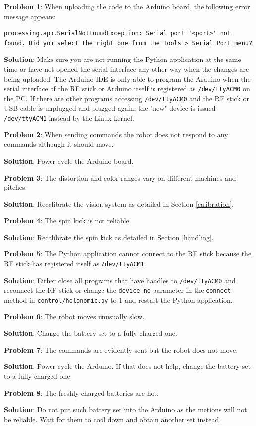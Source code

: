 \documentclass[a4paper,12pt]{article}
\begin{document}
\textbf{Problem 1}: When uploading the code to the Arduino board, the following error message appears:
\begin{lstlisting}
processing.app.SerialNotFoundException: Serial port '<port>' not found. Did you select the right one from the Tools > Serial Port menu?
\end{lstlisting}

\textbf{Solution}: Make sure you are not running the Python application at the same time or have not opened the serial interface any other way when the changes are being uploaded. The Arduino IDE is only able to program the Arduino when the serial interface of the RF stick or Arduino itself is registered as \texttt{/dev/ttyACM0} on the PC. If there are other programs accessing \texttt{/dev/ttyACM0} and the RF stick or USB cable is unplugged and plugged again, the "new" device is issued \texttt{/dev/ttyACM1} instead by the Linux kernel.

\bigskip

\textbf{Problem 2}: When sending commands the robot does not respond to any commands although it should move.

\textbf{Solution}: Power cycle the Arduino board.

\bigskip

\textbf{Problem 3}: The distortion and color ranges vary on different machines and pitches.

\textbf{Solution}: Recalibrate the vision system as detailed in Section \ref{calibration}.

\bigskip

\textbf{Problem 4}: The spin kick is not reliable.

\textbf{Solution}: Recalibrate the spin kick as detailed in Section \ref{handling}.

\bigskip

\textbf{Problem 5}: The Python application cannot connect to the RF stick because the RF stick has registered itself as \texttt{/dev/ttyACM1}.

\textbf{Solution}: Either close all programs that have handles to \texttt{/dev/ttyACM0} and reconnect the RF stick or change the \texttt{device\_no} parameter in the \texttt{connect} method in \texttt{control/holonomic.py} to 1 and restart the Python application.

\bigskip

\textbf{Problem 6}: The robot moves unusually slow.

\textbf{Solution}: Change the battery set to a fully charged one.

\bigskip

\textbf{Problem 7}: The commands are evidently sent but the robot does not move.

\textbf{Solution}: Power cycle the Arduino. If that does not help, change the battery set to a fully charged one.

\bigskip

\textbf{Problem 8}: The freshly charged batteries are hot.

\textbf{Solution}: Do not put such battery set into the Arduino as the motions will not be reliable. Wait for them to cool down and obtain another set instead.
\end{document}
